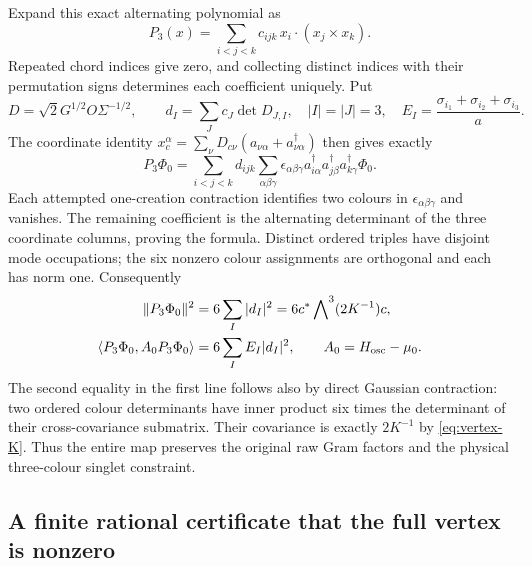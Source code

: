 Expand this exact alternating polynomial as
\[
 P_3(x)=\sum_{i<j<k}c_{ijk}\,
                 x_i\cdot(x_j\times x_k).
\]
Repeated chord indices give zero, and collecting distinct indices with
their permutation signs determines each coefficient uniquely. Put
\[
 D=\sqrt2G^{1/2}O\Sigma^{-1/2},\qquad
 d_I=\sum_J c_J\det D_{J,I},\quad |I|=|J|=3,
 \quad E_I=\frac{\sigma_{i_1}+\sigma_{i_2}+\sigma_{i_3}}a.
\]
The coordinate identity $x_c^\alpha=\sum_\nu D_{c\nu}
(a_{\nu\alpha}+a^\dagger_{\nu\alpha})$ then gives exactly
\begin{equation}\label{eq:vertex-three-state}
 P_3\Phi_0=\sum_{i<j<k}d_{ijk}\sum_{\alpha\beta\gamma}
   \epsilon_{\alpha\beta\gamma}
   a^\dagger_{i\alpha}a^\dagger_{j\beta}a^\dagger_{k\gamma}\Phi_0.
\end{equation}
Each attempted one-creation contraction identifies two colours in
$\epsilon_{\alpha\beta\gamma}$ and vanishes. The remaining
coefficient is the alternating determinant of the three coordinate
columns, proving the formula. Distinct ordered triples have disjoint
mode occupations; the six nonzero colour assignments are orthogonal
and each has norm one. Consequently
\begin{align}
 \|P_3\Phi_0\|^2&=6\sum_I|d_I|^2
       =6c^*\bigwedge\nolimits^3(2K^{-1})c,\nonumber\\
 \langle P_3\Phi_0,A_0P_3\Phi_0\rangle&=6\sum_I E_I|d_I|^2,
 \qquad A_0=H_{\rm osc}-\mu_0 .\label{eq:vertex-raw-moments}
\end{align}
The second equality in the first line follows also by direct Gaussian
contraction: two ordered colour determinants have inner product six
times the determinant of their cross-covariance submatrix. Their
covariance is exactly $2K^{-1}$ by \eqref{eq:vertex-K}.
Thus the entire map preserves the original raw Gram factors and
the physical three-colour singlet constraint.

\subsection{A finite rational certificate that the full vertex is nonzero}

